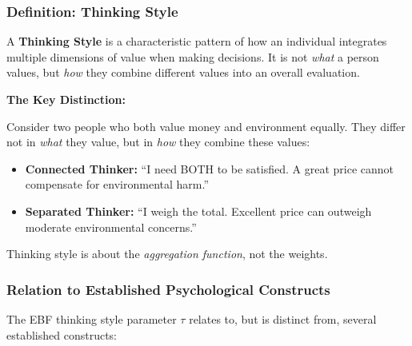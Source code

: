 \subsubsection{Definition: Thinking Style}

\begin{definition}
\label{def:thinking-style}
A \textbf{Thinking Style} is a characteristic pattern of how an individual integrates multiple dimensions of value when making decisions. It is not \textit{what} a person values, but \textit{how} they combine different values into an overall evaluation.
\end{definition}

\begin{intuition}
\textbf{The Key Distinction:}

Consider two people who both value money and environment equally. They differ not in \textit{what} they value, but in \textit{how} they combine these values:

\begin{itemize}
\item \textbf{Connected Thinker:} ``I need BOTH to be satisfied. A great price cannot compensate for environmental harm.''
\item \textbf{Separated Thinker:} ``I weigh the total. Excellent price can outweigh moderate environmental concerns.''
\end{itemize}

Thinking style is about the \textit{aggregation function}, not the weights.
\end{intuition}

\subsubsection{Relation to Established Psychological Constructs}

The EBF thinking style parameter $\tau$ relates to, but is distinct from, several established constructs:

